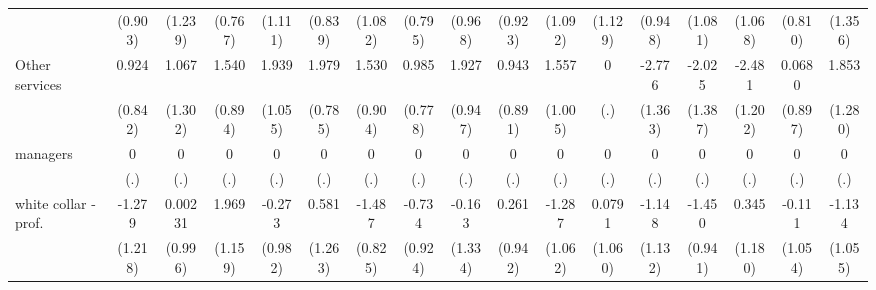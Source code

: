 {\begin{tabular}{l*{16}{c}}
                    &     (0.903)         &     (1.239)         &     (0.767)         &     (1.111)         &     (0.839)         &     (1.082)         &     (0.795)         &     (0.968)         &     (0.923)         &     (1.092)         &     (1.129)         &     (0.948)         &     (1.081)         &     (1.068)         &     (0.810)         &     (1.356)         \\
[1em]
Other services      &       0.924         &       1.067         &       1.540         &       1.939         &       1.979\sym{*}  &       1.530         &       0.985         &       1.927\sym{*}  &       0.943         &       1.557         &           0         &      -2.776\sym{*}  &      -2.025         &      -2.481\sym{*}  &      0.0680         &       1.853         \\
                    &     (0.842)         &     (1.302)         &     (0.894)         &     (1.055)         &     (0.785)         &     (0.904)         &     (0.778)         &     (0.947)         &     (0.891)         &     (1.005)         &         (.)         &     (1.363)         &     (1.387)         &     (1.202)         &     (0.897)         &     (1.280)         \\
[1em]
managers            &           0         &           0         &           0         &           0         &           0         &           0         &           0         &           0         &           0         &           0         &           0         &           0         &           0         &           0         &           0         &           0         \\
                    &         (.)         &         (.)         &         (.)         &         (.)         &         (.)         &         (.)         &         (.)         &         (.)         &         (.)         &         (.)         &         (.)         &         (.)         &         (.)         &         (.)         &         (.)         &         (.)         \\
[1em]
white collar - prof.&      -1.279         &     0.00231         &       1.969         &      -0.273         &       0.581         &      -1.487         &      -0.734         &      -0.163         &       0.261         &      -1.287         &      0.0791         &      -1.148         &      -1.450         &       0.345         &      -0.111         &      -1.134         \\
                    &     (1.218)         &     (0.996)         &     (1.159)         &     (0.982)         &     (1.263)         &     (0.825)         &     (0.924)         &     (1.334)         &     (0.942)         &     (1.062)         &     (1.060)         &     (1.132)         &     (0.941)         &     (1.180)         &     (1.054)         &     (1.055)         \\

\end{tabular}}
